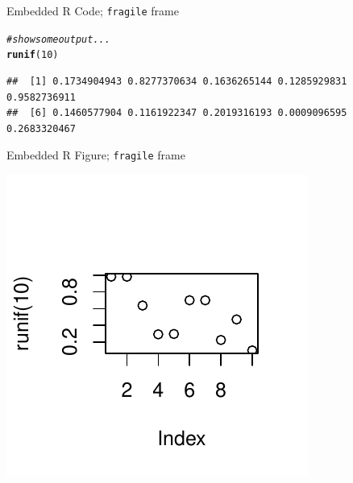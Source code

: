 \documentclass[12pt]{beamer}\usepackage[]{graphicx}\usepackage[]{color}
\makeatletter
\def\maxwidth{ %
  \ifdim\Gin@nat@width>\linewidth
    \linewidth
  \else
    \Gin@nat@width
  \fi
}
\newcommand{\hlnum}[1]{\textcolor[rgb]{0.686,0.059,0.569}{#1}}%
\newcommand{\hlcom}[1]{\textcolor[rgb]{0.678,0.584,0.686}{\textit{#1}}}%
\newcommand{\hlstd}[1]{\textcolor[rgb]{0.345,0.345,0.345}{#1}}%
\newcommand{\hlkwd}[1]{\textcolor[rgb]{0.737,0.353,0.396}{\textbf{#1}}}%
\newenvironment{kframe}{%
 \def\at@end@of@kframe{}%
 \ifinner\ifhmode%
  \def\at@end@of@kframe{\end{minipage}}%
  \begin{minipage}{\columnwidth}%
 \fi\fi%
 \def\FrameCommand##1{\hskip\@totalleftmargin \hskip-\fboxsep
 \colorbox{shadecolor}{##1}\hskip-\fboxsep
     \hskip-\linewidth \hskip-\@totalleftmargin \hskip\columnwidth}%
 \MakeFramed {\advance\hsize-\width
   \@totalleftmargin\z@ \linewidth\hsize
   \@setminipage}}%
 {\par\unskip\endMakeFramed%
 \at@end@of@kframe}
\newenvironment{knitrout}{}{} %
\makeatother
\begin{document}
\begin{frame}[fragile]{Embedded R Code; \texttt{fragile} frame}
\begin{block}

\begin{knitrout}
\color{fgcolor}\begin{kframe}
\begin{alltt}
\hlcom{# show some output...}
\hlkwd{runif}\hlstd{(}\hlnum{10}\hlstd{)}
\end{alltt}
\begin{verbatim}
##  [1] 0.1734904943 0.8277370634 0.1636265144 0.1285929831 0.9582736911
##  [6] 0.1460577904 0.1161922347 0.2019316193 0.0009096595 0.2683320467
\end{verbatim}
\end{kframe}
\end{knitrout}

\end{block}
\end{frame}

\begin{frame}[fragile]{Embedded R Figure; \texttt{fragile} frame}

\begin{knitrout}
\color{fgcolor}

{\centering \includegraphics[width=\maxwidth]{figure/unnamed-chunk-2-1} 

}



\end{knitrout}

\end{frame}
\end{document}

